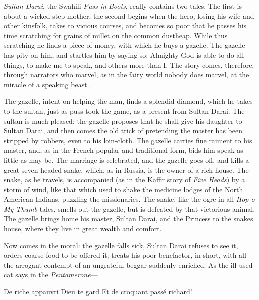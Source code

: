 \documentclass[14pt,a4paper]{memoir}
\begin{document}
\emph{Sultan Darai}, the Swahili \emph{Puss in Boots}, really contains
two tales. The first is about a wicked step-mother; the second begins
when the hero, losing his wife and other kinsfolk, takes to vicious
courses, and becomes so poor that he passes his time scratching for
grains of millet on the common dustheap. While thus scratching he finds
a piece of money, with which he buys a gazelle. The gazelle has pity on
him, and startles him by saying so: \textquotesingle Almighty God is
able to do all things, to make me to speak, and others more than
I.\textquotesingle{} The story comes, therefore, through narrators who
marvel, as in the fairy world nobody does marvel, at the miracle of a
speaking beast.

The gazelle, intent on helping the man, finds a splendid diamond, which
he takes to the sultan, just as puss took the game, as
\textquotesingle a present from Sultan Darai.\textquotesingle{} The
sultan is much pleased; the gazelle proposes that he shall give his
daughter to Sultan Darai, and then comes the old trick of pretending the
master has been stripped by robbers, \textquotesingle even to his
loin-cloth.\textquotesingle{} The gazelle carries fine raiment to his
master, and, as in the French popular and traditional form, bids him
speak as little as may be. The marriage is celebrated, and the gazelle
goes off, and kills a great seven-headed snake, which, as in Russia, is
the owner of a rich house. The snake, as he travels, is accompanied (as
in the Kaffir story of \emph{Five Heads}) by a storm of wind, like that
which used to shake the \textquotesingle medicine
lodges\textquotesingle{} of the North American Indians, puzzling the
missionaries. The snake, like the ogre in all \emph{Hop
o\textquotesingle{} My Thumb} tales, smells out the gazelle, but is
defeated by that victorious animal. The gazelle brings home his master,
Sultan Darai, and the Princess to the snake\textquotesingle s house,
where they live in great wealth and comfort.

Now comes in the moral: the gazelle falls sick, Sultan Darai refuses to
see it, orders coarse food to be offered it; treats his poor benefactor,
in short, with all the arrogant contempt of an ungrateful beggar
suddenly enriched. As the ill-used cat says in the \emph{Pentamerone}---

\protect\hypertarget{4533318093929944247_33931-h-1.htm.xhtml}{}{}

{De riche appauvri Dieu te gard\textquotesingle{}} {Et de croquant passé
richard!}
\end{document}

